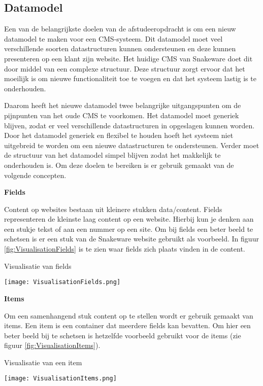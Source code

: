 \subsection{Datamodel}
Een van de belangrijkste doelen van de afstudeeropdracht is om een nieuw datamodel te maken voor een CMS-systeem.
Dit datamodel moet veel verschillende soorten datastructuren kunnen ondersteunen en deze kunnen presenteren op een klant zijn website.
Het huidige CMS van Snakeware doet dit door middel van een complexe structuur.
Deze structuur zorgt ervoor dat het moeilijk is om nieuwe functionaliteit toe te voegen en dat het systeem lastig is te onderhouden.

\whitespace
Daarom heeft het nieuwe datamodel twee belangrijke uitgangspunten om de pijnpunten van het oude CMS te voorkomen.
Het datamodel moet generiek blijven, zodat er veel verschillende datastructuren in opgeslagen kunnen worden.
Door het datamodel generiek en flexibel te houden hoeft het systeem niet uitgebreid te worden om een nieuwe datastructuren te ondersteunen.
Verder moet de structuur van het datamodel simpel blijven zodat het makkelijk te onderhouden is.
Om deze doelen te bereiken is er gebruik gemaakt van de volgende concepten.

\whitespace
\textbf{Fields}

\whitespace
Content op websites bestaan uit kleinere stukken data\slash content.
Fields representeren de kleinste laag content op een website. 
Hierbij kun je denken aan een stukje tekst of aan een nummer op een site.
Om bij fields een beter beeld te schetsen is er een stuk van de Snakeware website gebruikt als voorbeeld.
In figuur \ref{fig:VisualisationFields} is te zien  waar fields zich plaats vinden in de content.

\whitespace[2]
\begin{graphic}
    \captionsetup{type=figure}
    \caption{Visualisatie van fields}
    \texttt{[image: VisualisationFields.png]}
    \label{fig:VisualisationFields}
\end{graphic}

\whitespace
\textbf{Items}

\whitespace
Om een samenhangend stuk content op te stellen wordt er gebruik gemaakt van items.
Een item is een container dat meerdere fields kan bevatten.
Om hier een beter beeld bij te schetsen is hetzelfde voorbeeld gebruikt voor de items (zie figuur \ref{fig:VisualisationItems}).

\whitespace[2]
\begin{graphic}
    \captionsetup{type=figure}
    \caption{Visualisatie van een item}
    \texttt{[image: VisualisationItems.png]}
    \label{fig:VisualisationItems}
\end{graphic}

